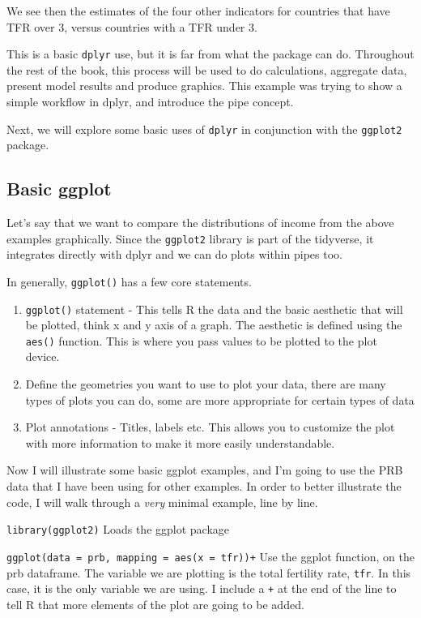 \documentclass[
]{article}
\providecommand{\tightlist}{%
  \setlength{\itemsep}{0pt}\setlength{\parskip}{0pt}}
\begin{document}
We see then the estimates of the four other indicators for countries
that have TFR over 3, versus countries with a TFR under 3.

This is a basic \texttt{dplyr} use, but it is far from what the package can do.
Throughout the rest of the book, this process will be used to do
calculations, aggregate data, present model results and produce
graphics. This example was trying to show a simple workflow in dplyr,
and introduce the pipe concept.

Next, we will explore some basic uses of \texttt{dplyr} in conjunction with the
\texttt{ggplot2} package.

\hypertarget{basic-ggplot}{%
\subsection{Basic ggplot}\label{basic-ggplot}}

Let's say that we want to compare the distributions of income from the
above examples graphically. Since the \texttt{ggplot2} library is part of the
tidyverse, it integrates directly with dplyr and we can do plots within
pipes too.

In generally, \texttt{ggplot()} has a few core statements.

\begin{enumerate}
\def\labelenumi{\arabic{enumi})}
\tightlist
\item
  \texttt{ggplot()} statement - This tells R the data and the basic aesthetic
  that will be plotted, think x and y axis of a graph. The aesthetic
  is defined using the \texttt{aes()} function. This is where you pass values
  to be plotted to the plot device.
\item
  Define the geometries you want to use to plot your data, there are
  many types of plots you can do, some are more appropriate for
  certain types of data
\item
  Plot annotations - Titles, labels etc. This allows you to customize
  the plot with more information to make it more easily
  understandable.
\end{enumerate}

Now I will illustrate some basic ggplot examples, and I'm going to use
the PRB data that I have been using for other examples. In order to
better illustrate the code, I will walk through a \emph{very} minimal
example, line by line.

\texttt{library(ggplot2)} Loads the ggplot package

\texttt{ggplot(data\ =\ prb,\ mapping\ =\ aes(x\ =\ tfr))+} Use the ggplot function,
on the prb dataframe. The variable we are plotting is the total
fertility rate, \texttt{tfr}. In this case, it is the only variable we are
using. I include a \texttt{+} at the end of the line to tell R that more
elements of the plot are going to be added.
\end{document}
